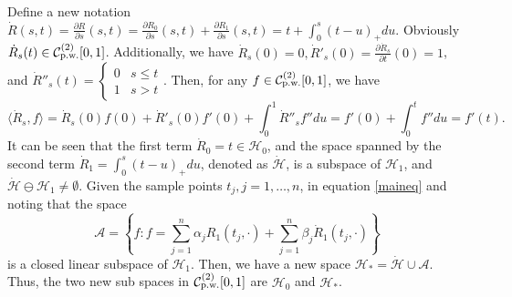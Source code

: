 Define a new notation $\dot{R}(s,t)=\frac{\partial R}{\partial s}(s,t)=\frac{\partial R_0}{\partial s}(s,t)+\frac{\partial R_1}{\partial s}(s,t)=t+\int_0^s(t-u)_+du$. Obviously $\dot{R}_s(t) \in \mathcal{C}_{\mbox{\scriptsize p.w.}}^{(2)}[0,1]$. Additionally, we have $\dot{R}_s(0)=0, \dot{R}'_s(0)=\frac{\partial \dot{R}_s}{\partial t}(0)=1$, and $ \dot{R}''_s(t)=\begin{cases}
0 & s\leq t \\ 1 & s>t \end{cases}$. Then, for any $f\in \mathcal{C}_{\mbox{\scriptsize p.w.}}^{(2)}[0,1]$, we have 
\begin{equation*}
\langle \dot{R}_s,f\rangle =\dot{R}_s(0)f(0)+\dot{R}'_s(0)f'(0)+\int_0^1\dot{R}''_s f''	 du=f'(0)+\int_0^t f''du=f'(t).
\end{equation*}
%
It can be seen that the first term $\dot{R}_0=t\in \mathcal{H}_0$, and the space spanned by the second term $\dot{R}_1=\int_0^s(t-u)_+du$, denoted as $\mathcal{\dot{H}}$, is a subspace of $\mathcal{H}_1$, and $\mathcal{\dot{H}} \ominus \mathcal{H}_1\neq \emptyset$. Given the sample points $t_j, j=1, \ldots, n$, in equation \eqref{maineq} and noting that the space
\begin{equation*}
\mathcal{A}=\left\lbrace f: f=\sum_{j=1}^{n}\alpha_jR_1(t_j,\cdot)+\sum_{j=1}^{n}\beta_j\dot{R}_1(t_j,\cdot)\right\rbrace 
\end{equation*}
is a closed linear subspace of $\mathcal{H}_1$. Then, we have a new space $\mathcal{H}_*=\mathcal{\dot{H}} \cup \mathcal{A}$. Thus, the two new sub spaces in $\mathcal{C}_{\mbox{\scriptsize p.w.}}^{(2)}[0,1]$ are $\mathcal{H}_0$ and $\mathcal{H}_*$.


